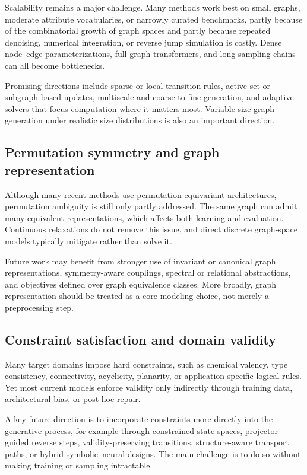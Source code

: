 \documentclass{article}
\begin{document}
Scalability remains a major challenge. Many methods work best on small graphs, moderate attribute vocabularies, or narrowly curated benchmarks, partly because of the combinatorial growth of graph spaces and partly because repeated denoising, numerical integration, or reverse jump simulation is costly. Dense node--edge parameterizations, full-graph transformers, and long sampling chains can all become bottlenecks.

Promising directions include sparse or local transition rules, active-set or subgraph-based updates, multiscale and coarse-to-fine generation, and adaptive solvers that focus computation where it matters most. Variable-size graph generation under realistic size distributions is also an important direction.

\subsection{Permutation symmetry and graph representation}

Although many recent methods use permutation-equivariant architectures, permutation ambiguity is still only partly addressed. The same graph can admit many equivalent representations, which affects both learning and evaluation. Continuous relaxations do not remove this issue, and direct discrete graph-space models typically mitigate rather than solve it.

Future work may benefit from stronger use of invariant or canonical graph representations, symmetry-aware couplings, spectral or relational abstractions, and objectives defined over graph equivalence classes. More broadly, graph representation should be treated as a core modeling choice, not merely a preprocessing step.

\subsection{Constraint satisfaction and domain validity}

Many target domains impose hard constraints, such as chemical valency, type consistency, connectivity, acyclicity, planarity, or application-specific logical rules. Yet most current models enforce validity only indirectly through training data, architectural bias, or post hoc repair.

A key future direction is to incorporate constraints more directly into the generative process, for example through constrained state spaces, projector-guided reverse steps, validity-preserving transitions, structure-aware transport paths, or hybrid symbolic--neural designs. The main challenge is to do so without making training or sampling intractable.
\end{document}
